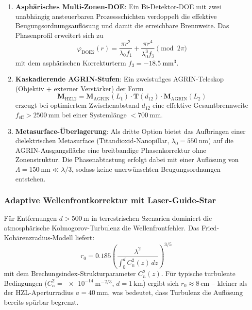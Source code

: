 ﻿\documentclass[12pt,a4paper]{article}
\theoremstyle{definition}
\newcommand{\eff}{\mathrm{eff}}
\newcommand{\AGRIN}{\mathrm{AGRIN}}
\begin{document}
	\begin{enumerate}[label=(\alph*)]
		\item \textbf{Asphärisches Multi-Zonen-DOE}: Ein Bi-Detektor-DOE mit
		zwei unabhängig ansteuerbaren Prozessschichten verdoppelt die
		effektive Beugungsordnungsauflösung und damit die erreichbare
		Brennweite.  Das Phasenprofil erweitert sich zu
		\begin{equation}
			\varphi_\mathrm{DOE2}(r)
			= \frac{\pi r^2}{\lambda_0 f_1}
			+ \frac{\pi r^4}{\lambda_0^3 f_3}
			\pmod{2\pi}
			\label{eq:doe2_phase}
		\end{equation}
		mit dem asphärischen Korrekturterm $f_3 = \SI{-18.5}{\milli\metre\cubed}$.

		\item \textbf{Kaskadierende AGRIN-Stufen}: Ein zweistufiges
		AGRIN-Teleskop (Objektiv + externer Verstärker) der Form
		\begin{equation}
			\mathbf{M}_\mathrm{HZL2}
			= \mathbf{M}_\AGRIN(L_1)\cdot\mathbf{T}(d_{12})\cdot\mathbf{M}_\AGRIN(L_2)
		\end{equation}
		erzeugt bei optimiertem Zwischenabstand $d_{12}$ eine effektive
		Gesamtbrennweite $f_\eff > \SI{2500}{\milli\metre}$ bei einer
		Systemlänge $< \SI{700}{\milli\metre}$.

		\item \textbf{Metasurface-Überlagerung}: Als dritte Option bietet
		das Aufbringen einer dielektrischen Metasurface (Titandioxid-Nanopillar,
		$\lambda_0 = \SI{550}{\nano\metre}$) auf die AGRIN-Ausgangsfläche
		eine breitbandige Phasenkorrektur ohne Zonenstruktur.  Die
		Phasenabtastung erfolgt dabei mit einer Auflösung von
		$\Lambda = \SI{150}{\nano\metre} \ll \lambda/3$, sodass keine
		unerwünschten Beugungsordnungen entstehen.
	\end{enumerate}

	\subsubsection{Adaptive Wellenfrontkorrektur mit Laser-Guide-Star}

	Für Entfernungen $d > \SI{500}{\metre}$ in terrestrischen Szenarien
	dominiert die atmosphärische Kolmogorov-Turbulenz die
	Wellenfrontfehler.  Das Fried-Kohärenzradius-Modell liefert:
	\begin{equation}
		r_0 = 0.185\!\left(\frac{\lambda^2}{\int_0^d C_n^2(z)\,dz}\right)^{3/5}
		\label{eq:fried}
	\end{equation}
	mit dem Brechungsindex-Strukturparameter $C_n^2(z)$.  Für typische
	turbulente Bedingungen ($C_n^2 = \SI{e-14}{\metre^{-2/3}}$,
	$d = \SI{1}{\kilo\metre}$) ergibt sich $r_0 \approx \SI{8}{\centi\metre}$
	-- kleiner als der HZL-Aperturradius $a = \SI{40}{\milli\metre}$, was
	bedeutet, dass Turbulenz die Auflösung bereits spürbar begrenzt.
\end{document}
